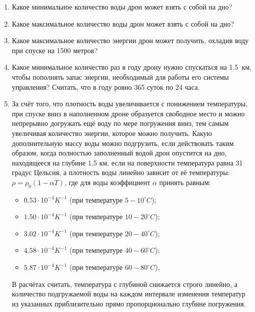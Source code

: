\begin{enumerate}
    \item Какое минимальное количество воды дрон может взять с собой на дно?
    \item Какое максимальное количество воды дрон может взять с собой на дно?
    \item Какое максимальное количество энергии дрон может получить, охладив воду при спуске на 1500 метров?
    \item Какое минимальное количество раз в году дрону нужно спускаться на 1.5~км, чтобы пополнять запас энергии, 
    необходимый для работы его системы управления? Считать, что в году ровно 365 суток по 24 часа.
    \item За счёт того, что плотность воды увеличивается с понижением температуры, при спуске вниз в 
    наполненном дроне образуется свободное место и можно непрерывно догружать ещё воду по мере погружения 
    вниз, тем самым увеличивая количество энергии, которое можно получить. Какую дополнительную массу 
    воды можно подгрузить, если действовать таким образом, когда полностью заполненный водой дрон опустится 
    на дно, находящееся на глубине 1.5 км, если на поверхности температура равна 31 градус Цельсия, а 
    плотность воды линейно зависит от её температуры: $\rho=\rho_0 (1-\alpha T)$, где для воды коэффициент $\alpha$ 
    принять равным:
    \begin{itemize}
        \item $0.53 \cdot 10^{-4} K^{-1}$ (при температуре $5-10^{\circ}C$);
        \item $1.50 \cdot 10^{-4} K^{-1}$ (при температуре $10-20^{\circ}C$);
        \item $3.02 \cdot 10^{-4} K^{-1}$ (при температуре $20-40^{\circ}C$);
        \item $4.58 \cdot 10^{-4} K^{-1}$ (при температуре $40-60^{\circ}C$);
        \item $5.87 \cdot 10^{-4} K^{-1}$ (при температуре $60-80^{\circ}C$).
    \end{itemize}

    В расчётах считать, температура с глубиной снижается строго линейно, а количество подгружаемой воды на каждом интервале изменения температур из указанных приблизительно прямо пропорционально глубине погружения.
\end{enumerate}